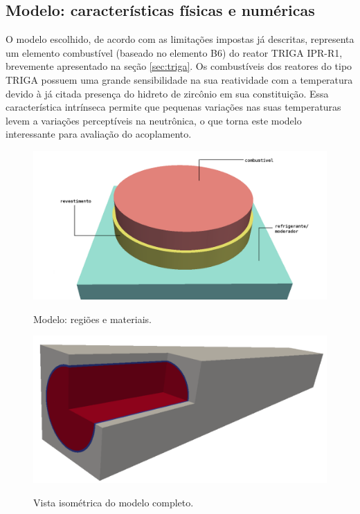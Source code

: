 


\subsection{Modelo: características físicas e numéricas}
\label{ssec:mod_fis_num}

O modelo escolhido, de acordo com as limitações impostas já descritas,
representa um elemento combustível (baseado no elemento B6) do reator TRIGA IPR-R1, brevemente
apresentado na seção \ref{sec:triga}. Os combustíveis dos reatores do tipo TRIGA
possuem uma grande sensibilidade na sua
reatividade com a temperatura devido à já citada presença do hidreto de zircônio
em sua constituição. Essa característica intrínseca permite que pequenas
variações nas suas temperaturas levem a variações perceptíveis na neutrônica,
o que torna este modelo interessante para avaliação do acoplamento.


\begin{figure}[htb]
  \caption{Modelo: regiões e materiais.}%
  \centering\includegraphics[scale=0.5]{figuras/regioes_surface2.png}
  \label{fig:regions}
\end{figure}

\begin{figure}[htb]
  \caption{Vista isométrica do modelo completo.}
  \centering\includegraphics[scale=0.5]{figuras/all_regions_isometric.png}
  \label{fig:region_isometric}
\end{figure}

